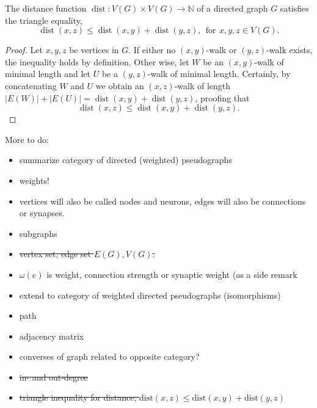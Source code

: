 \begin{proposition}
  The distance function $\operatorname{dist}: V(G) \times V(G) \to
  \mathbb{N}$ of a directed graph $G$ satisfies the triangle equality,
  \[
  \operatorname{dist}(x,z) \le \operatorname{dist}(x,y) +
  \operatorname{dist}(y,z), \:\: \mathrm{for}\:\, x,y,z \in V(G).
  \]
\end{proposition}

\begin{proof}
  Let $x,y,z$ be vertices in $G$. If either no $(x,y)$-walk or
  $(y,z)$-walk exists, the inequality holds by definition. Other wise,
  let $W$ be an $(x,y)$-walk of minimal length and let $U$ be a
  $(y,z)$-walk of minimal length. Certainly, by concatenating $W$ and
  $U$ we obtain an $(x,z)$-walk of length $|E(W)| + |E(U)| =
  \operatorname{dist}(x,y) + \operatorname{dist}(y,z)$, proofing
  that \[ \operatorname{dist}(x,z) \le \operatorname{dist}(x,y) +
  \operatorname{dist}(y,z).
  \]
\end{proof}







More to do:

\begin{itemize}
\item summarize category of directed (weighted) pseudographs
\item weights!
\item vertices will also be called nodes and neurons, edges will also
  be connections or synapses.
\item subgraphs
\item \sout{vertex set, edge set $E(G), V(G)$.}
\item $\omega(e)$ is weight, connection strength or synaptic weight
  (as a side remark
\item extend to category of weighted directed pseudographs
  (isomorphisms)
\item path
\item adjacency matrix
\item converses of graph related to opposite category?
\item \sout{in- and out-degree}
\item \sout{triangle inequality for distance, $\mathrm{dist}(x,z) \leq
  \mathrm{dist}(x,y) + \mathrm{dist}(y,z)$}
\end{itemize}



